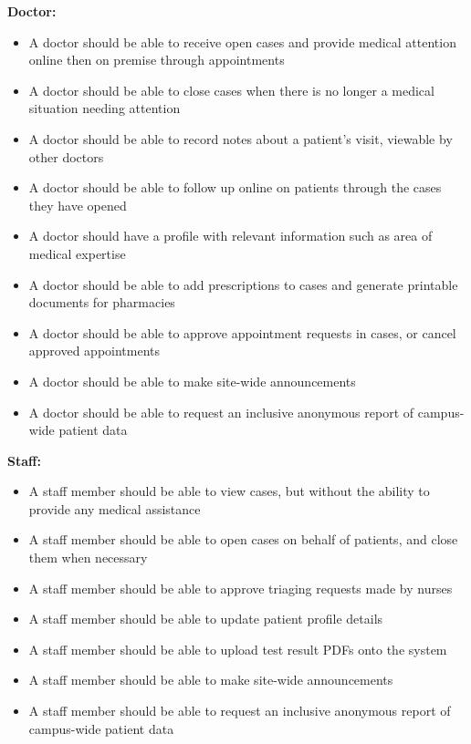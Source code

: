 \documentclass[a4paper, 12pt, titlepage]{article}
\begin{document}
  \textbf{Doctor:}
  \begin{itemize}
    \item A doctor should be able to receive open cases and provide medical attention online then on premise through appointments
    \item A doctor should be able to close cases when there is no longer a medical situation needing attention
    \item A doctor should be able to record notes about a patient's visit, viewable by other doctors
    \item A doctor should be able to follow up online on patients through the cases they have opened
    \item A doctor should have a profile with relevant information such as area of medical expertise
    \item A doctor should be able to add prescriptions to cases and generate printable documents for pharmacies
    \item A doctor should be able to approve appointment requests in cases, or cancel approved appointments
    \item A doctor should be able to make site-wide announcements
    \item A doctor should be able to request an inclusive anonymous report of campus-wide patient data
  \end{itemize}

  \textbf{Staff:}
  \begin{itemize}
    \item A staff member should be able to view cases, but without the ability to provide any medical assistance
    \item A staff member should be able to open cases on behalf of patients, and close them when necessary
    \item A staff member should be able to approve triaging requests made by nurses
    \item A staff member should be able to update patient profile details
    \item A staff member should be able to upload test result PDFs onto the system
    \item A staff member should be able to make site-wide announcements
    \item A staff member should be able to request an inclusive anonymous report of campus-wide patient data
  \end{itemize}
\end{document}
